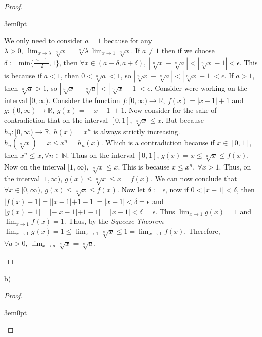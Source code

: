 \documentclass[11pt]{article}
\newcommand{\R}{\mathbb{R}}
\newcommand{\N}{\mathbb{N}}
\newenvironment{myproof}
{\begin{proof} \begin{adjustwidth}{3em}{0pt}$ $\par\nobreak\ignorespaces}
{\end{adjustwidth} \end{proof}}
\begin{document}
\begin{flushleft}
\begin{myproof}
We only need to consider $a = 1$ because for any $\lambda > 0, \ \lim_{x \to \lambda} \sqrt[n]{x} = \sqrt[n]{\lambda} \lim_{x \to 1} \sqrt[n]{x}$. If $a \neq 1$ then if we choose $\delta := \text{min} \{ \frac{|a-1|}{2} , 1 \}$, then $\forall x \in (a - \delta, a + \delta), \ |\sqrt[n]{x} - \sqrt[n]{a}| < |\sqrt[n]{x} -1| < \epsilon$. This is because if $a<1$, then $0 < \sqrt[n]{a} < 1$, so $|\sqrt[n]{x} - \sqrt[n]{a}| < |\sqrt[n]{x} - 1| <\epsilon$. If $a > 1$, then $\sqrt[n]{a} > 1$, so $|\sqrt[n]{x} - \sqrt[n]{a}| < |\sqrt[n]{x} - 1| < \epsilon$. Consider were working on the interval $[0,\infty)$. Consider the function $f:[0, \infty) \rightarrow \R, \ f(x) = |x-1|+1$ and $g:(0, \infty) \rightarrow \R, \ g(x) = -|x-1|+1$. Now consider for the sake of contradiction that on the interval $[0, 1]$, $\sqrt[n]{x} \leq x$. But because $h_n: [0, \infty) \rightarrow \R, \ h(x) = x^n$ is always strictly increasing. $h_n(\sqrt[n]{x}) = x \leq x^n = h_n(x)$. Which is a contradiction because if $x \in [0, 1]$, then $x^n \leq x, \forall n \in \N$. Thus on the interval $[0,1]$, $g(x) = x \leq \sqrt[n]{x} \leq f(x)$. Now on the interval $[1, \infty)$, $\sqrt[n]{x} \leq x$. This is because $x \leq x^n, \ \forall x > 1$. Thus, on the interval $[1, \infty)$, $g(x) \leq \sqrt[n]{x} \leq x = f(x)$. We can now conclude that $\forall x \in [0, \infty), \ g(x)\leq \sqrt[n]{x} \leq f(x)$. Now let $\delta := \epsilon$, now if $0<|x-1|<\delta$, then $|f(x) - 1| = ||x-1|+1-1| = |x-1| < \delta = \epsilon$ and $|g(x) - 1| = |-|x-1|+1-1| = |x-1| < \delta = \epsilon$. Thus $\lim_{x \to 1} g(x) = 1$ and $\lim_{x \to 1}f(x) = 1$. Thus, by the \textit{Squeeze Theorem} $\lim_{x \to 1} g(x) = 1 \leq \lim_{x \to 1} \sqrt[n]{x} \leq 1 = \lim_{x \to 1} f(x)$. Therefore, $\forall a > 0, \ \lim_{x \to a} \sqrt[n]{x} = \sqrt[n]{a}$.

\end{myproof}

b)

\begin{myproof}


\end{myproof}
\end{flushleft}
\end{document}

